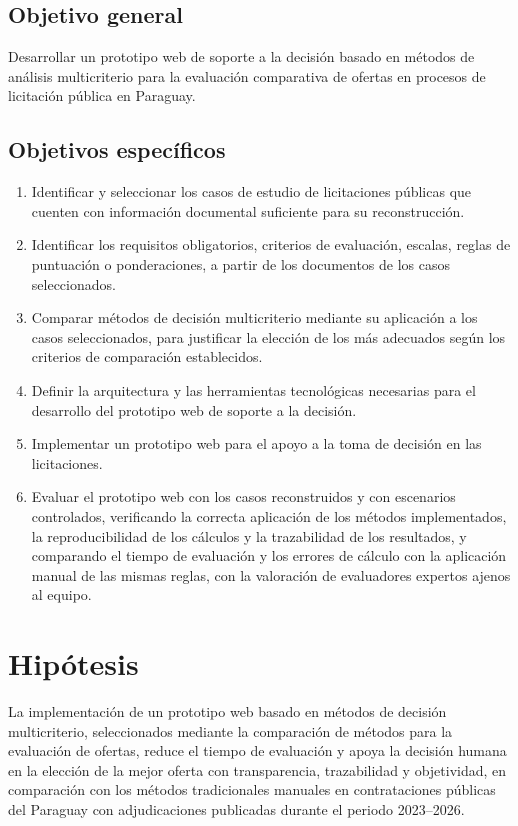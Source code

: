 \documentclass[12pt,a4paper]{article}
\begin{document}
\subsection{Objetivo general}

Desarrollar un prototipo web de soporte a la decisión basado en métodos de análisis multicriterio para la evaluación comparativa de ofertas en procesos de licitación pública en Paraguay.

\subsection{Objetivos específicos}

\begin{enumerate}
\item Identificar y seleccionar los casos de estudio de licitaciones públicas que cuenten con información documental suficiente para su reconstrucción.
\item Identificar los requisitos obligatorios, criterios de evaluación, escalas, reglas de puntuación o ponderaciones, a partir de los documentos de los casos seleccionados.
\item Comparar métodos de decisión multicriterio mediante su aplicación a los casos seleccionados, para justificar la elección de los más adecuados según los criterios de comparación establecidos.
\item Definir la arquitectura y las herramientas tecnológicas necesarias para el desarrollo del prototipo web de soporte a la decisión.
\item Implementar un prototipo web para el apoyo a la toma de decisión en las licitaciones.
\item Evaluar el prototipo web con los casos reconstruidos y con escenarios controlados, verificando la correcta aplicación de los métodos implementados, la reproducibilidad de los cálculos y la trazabilidad de los resultados, y comparando el tiempo de evaluación y los errores de cálculo con la aplicación manual de las mismas reglas, con la valoración de evaluadores expertos ajenos al equipo.
\end{enumerate}

\section{Hipótesis}

La implementación de un prototipo web basado en métodos de decisión multicriterio, seleccionados mediante la comparación de métodos para la evaluación de ofertas, reduce el tiempo de evaluación y apoya la decisión humana en la elección de la mejor oferta con transparencia, trazabilidad y objetividad, en comparación con los métodos tradicionales manuales en contrataciones públicas del Paraguay con adjudicaciones publicadas durante el periodo 2023–2026.
\end{document}
